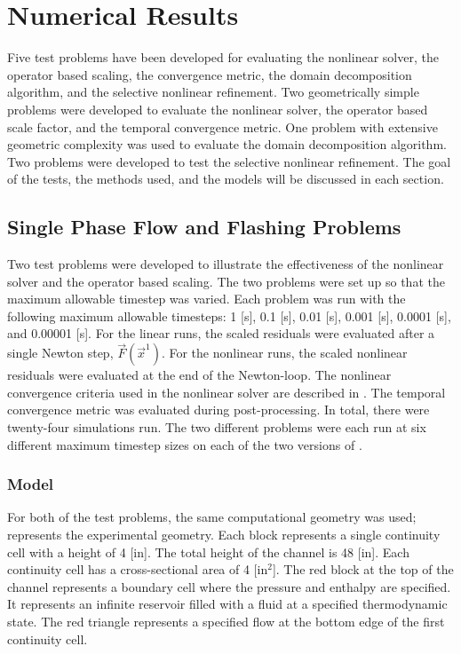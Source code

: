 \chapter{Numerical Results}
\label{chap:results}

Five test problems have been developed for evaluating the nonlinear solver, the operator based scaling, the convergence metric, the domain decomposition algorithm, and the selective nonlinear refinement.
Two geometrically simple problems were developed to evaluate the nonlinear solver, the operator based scale factor, and the temporal convergence metric.
One problem with extensive geometric complexity was used to evaluate the domain decomposition algorithm.
Two problems were developed to test the selective nonlinear refinement.
The goal of the tests, the methods used, and the models will be discussed in each section.

\section{Single Phase Flow and Flashing Problems}
\label{sect:single_phase_and_flashing}

Two test problems were developed to illustrate the effectiveness of the nonlinear solver and the operator based scaling.
The two problems were set up so that the maximum allowable timestep was varied.
Each problem was run with the following maximum allowable timesteps: 1 [s], 0.1 [s], 0.01 [s], 0.001 [s], 0.0001 [s], and 0.00001 [s]. 
For the linear runs, the scaled residuals were evaluated after a single Newton step, $\vec{F}(\vec{x}^{1})$.
For the nonlinear runs, the scaled nonlinear residuals were evaluated at the end of the Newton-loop.
The nonlinear convergence criteria used in the nonlinear solver are described in .
The temporal convergence metric was evaluated during post-processing.
In total, there were twenty-four simulations run.
The two different problems were each run at six different maximum timestep sizes on each of the two versions of \cobra{}.

\subsection{Model}
\label{subsect:single_model}
For both of the test problems, the same computational geometry was used;   represents the experimental geometry.
Each block represents a single continuity cell with a height of 4 [in].
The total height of the channel is 48 [in].
Each continuity cell has a cross-sectional area of 4 [in$^2$].
The red block at the top of the channel represents a boundary cell where the pressure and enthalpy are specified.
It represents an infinite reservoir filled with a fluid at a specified thermodynamic state.
The red triangle represents a specified flow at the bottom edge of the first continuity cell. 

